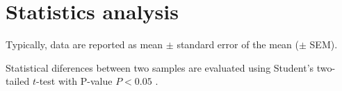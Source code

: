 %
%
%

\section{Statistics analysis}

Typically, data are reported as mean $\pm$ standard error of the mean ($\pm$
SEM).

Statistical diferences between two samples are evaluated using Student's
two-tailed $t$-test with P-value $P<0.05$ \citep{kurebayashi1993}.

